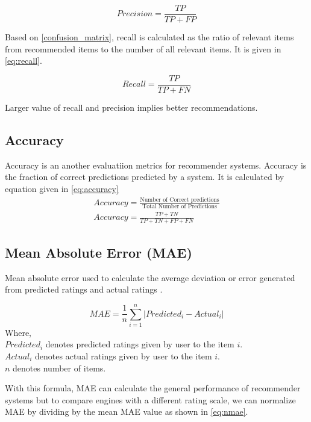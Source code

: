\begin{equation}
Precision = \frac{TP}{TP + FP} 
\label{eq:precision}
\end{equation}

\noindent Based on \autoref{confusion_matrix}, recall is calculated as the ratio of relevant items from recommended items to the number of all relevant items. It is given in \autoref{eq:recall}. 

\begin{equation}
Recall = \frac{TP}{TP + FN} 
\label{eq:recall}
\end{equation}

Larger value of recall and precision implies better recommendations.

\subsection{Accuracy}
\label{sec:accuracy}
Accuracy is an another evaluatiion metrics for recommender systems. Accuracy is the fraction of correct predictions predicted by a system. It is calculated by equation given in \autoref{eq:accuracy}
\begin{align}
Accuracy = \frac{\textrm{Number of Correct predictions}}{\textrm{Total Number of Predictions}} \\
Accuracy = \frac{TP + TN }{TP + TN + FP + FN}
\label{eq:accuracy}
\end{align}

\subsection{Mean Absolute Error (MAE)}
Mean absolute error used to calculate the average deviation or error generated from predicted ratings and actual ratings \cite{26}.

\begin{equation}
MAE = \frac{1}{n} \sum_{i=1}^{n}{\vert{Predicted_i - Actual_i} \vert}
\label{eq:mae}
\end{equation}
\noindent Where, \\ 
$Predicted_i$ \textsf{ denotes predicted ratings given by user to the item} $i.$ \\
$Actual_i$ \textsf{ denotes actual ratings given by user to the item } $i.$ \\
$n$ \textsf{denotes number of items.}

\noindent With this formula, MAE can calculate the general performance of recommender systems but to compare engines with a different rating scale, we can normalize MAE by dividing by the mean MAE value as shown in \autoref{eq:nmae}. 

